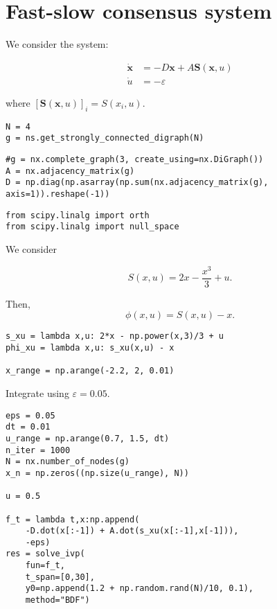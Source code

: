 \hypertarget{fast-slow-consensus-system}{%
\section{Fast-slow consensus system}\label{fast-slow-consensus-system}}

We consider the system:

\begin{equation}
\begin{aligned}
\dot{\mathbf{x}} &= -D\mathbf{x} + A\mathbf{S}(\mathbf{x}, u) \\
\dot{u} &= -\varepsilon
\end{aligned}
\end{equation}

where \([\mathbf{S}(\mathbf{x},u)]_i = S(x_i,u)\).

\begin{verbatim}
N = 4
g = ns.get_strongly_connected_digraph(N)
\end{verbatim}

\begin{verbatim}
#g = nx.complete_graph(3, create_using=nx.DiGraph())
A = nx.adjacency_matrix(g)
D = np.diag(np.asarray(np.sum(nx.adjacency_matrix(g), axis=1)).reshape(-1))
\end{verbatim}

\begin{verbatim}
from scipy.linalg import orth
from scipy.linalg import null_space
\end{verbatim}

We consider

\begin{equation}
S(x,u) = 2x - \frac{x^3}{3} + u.
\end{equation}

Then, \begin{equation}
\phi(x,u) = S(x,u) - x.
\end{equation}

\begin{verbatim}
s_xu = lambda x,u: 2*x - np.power(x,3)/3 + u
phi_xu = lambda x,u: s_xu(x,u) - x

x_range = np.arange(-2.2, 2, 0.01)
\end{verbatim}

Integrate using \(\varepsilon = 0.05\).

\begin{verbatim}
eps = 0.05
dt = 0.01
u_range = np.arange(0.7, 1.5, dt)
n_iter = 1000
N = nx.number_of_nodes(g)
x_n = np.zeros((np.size(u_range), N))

u = 0.5

f_t = lambda t,x:np.append(
    -D.dot(x[:-1]) + A.dot(s_xu(x[:-1],x[-1])),
    -eps)
res = solve_ivp(
    fun=f_t, 
    t_span=[0,30], 
    y0=np.append(1.2 + np.random.rand(N)/10, 0.1), 
    method="BDF")
\end{verbatim}

